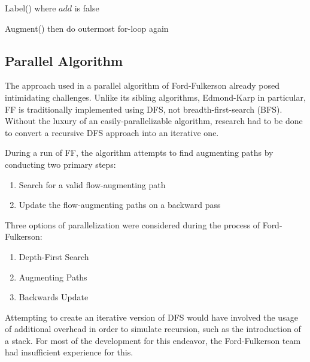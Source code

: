 \begin{algorithm}
\begin{algorithmic}[1]
                                        Label() where $add$ is false
                                    \EndIf
                            \EndIf
                        \EndFor
                        
                            Augment()
                            then do outermost for-loop again
                        \EndIf
                    \EndFor
                \EndFor\\
            \end{algorithmic}
        \end{algorithm}

\subsection{Parallel Algorithm}
        The approach used in a parallel algorithm of Ford-Fulkerson already posed intimidating challenges. Unlike its sibling algorithms, Edmond-Karp in particular, FF is traditionally implemented using DFS, not breadth-first-search (BFS). Without the luxury of an easily-parallelizable algorithm, research had to be done to convert a recursive DFS approach into an iterative one.
        
        During a run of FF, the algorithm attempts to find augmenting paths by conducting two primary steps:
        \begin{enumerate}
            \item Search for a valid flow-augmenting path
            \item Update the flow-augmenting paths on a backward pass
        \end{enumerate}
        
        
        Three options of parallelization were considered during the process of Ford-Fulkerson:
        \begin{enumerate}
            \item Depth-First Search
            \item Augmenting Paths
            \item Backwards Update
        \end{enumerate}
        Attempting to create an iterative version of DFS would have involved the usage of additional overhead in order to simulate recursion, such as the introduction of a stack. For most of the development for this endeavor, the Ford-Fulkerson team had insufficient experience for this.
        
